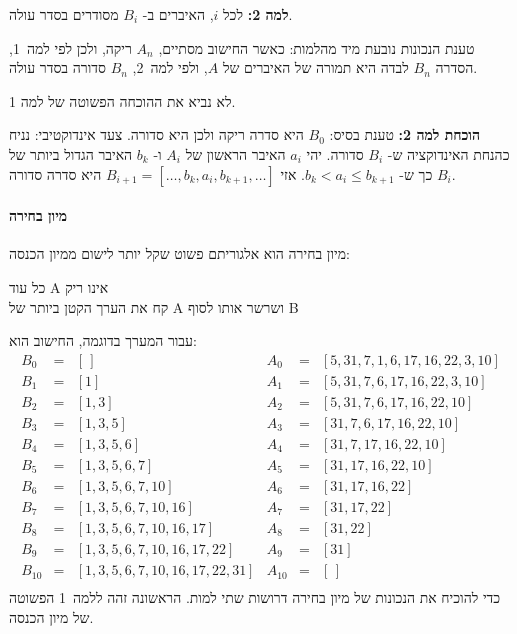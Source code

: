\textbf{%
למה %
2:}
לכל
$i$,
האיברים ב-%
$B_i$
מסודרים בסדר עולה.

טענת הנכונות נובעת מיד מהלמות: כאשר החישוב מסתיים, 
$A_n$
ריקה, ולכן לפי למה~1, הסדרה
$B_n$
לבדה היא תמורה של האיברים של
$A$,
ולפי למה~2,
$B_n$
סדורה בסדר עולה.

לא נביא את ההוכחה הפשוטה של למה 1.

\textbf{%
הוכחת למה %
2:}
טענת בסיס: 
$B_0$
היא סדרה ריקה ולכן היא סדורה. צעד אינדוקטיבי: נניח כהנחת האינדוקציה ש-%
$B_i$
סדורה. יהי 
$a_i$
האיבר הראשון של
$A_i$
ו-%
$b_k$
האיבר הגדול ביותר של
$B_i$
כך ש-%
$b_k < a_i \leq b_{k+1}$. 
אזי
$B_{i+1} = [\ldots,b_k,a_i,b_{k+1},\ldots]$
היא סדרה סדורה.

\paragraph{%
מיון בחירה%
}

מיון בחירה הוא אלגוריתם פשוט שקל יותר לישום ממיון הכנסה:

\medskip

\hspace*{3em}%
כל עוד A אינו ריק\\
\hspace*{6em}%
קח את הערך הקטן ביותר של A ושרשר אותו לסוף B

\medskip

עבור המערך בדוגמה, החישוב הוא:
\[
\begin{array}{lll}
B_0&=&[\,]\\
B_1&=&[1]\\
B_2&=&[1,3]\\
B_3&=&[1,3,5]\\
B_4&=&[1,3,5,6]\\
B_5&=&[1,3,5,6,7]\\
B_6&=&[1,3,5,6,7,10]\\
B_7&=&[1,3,5,6,7,10,16]\\
B_8&=&[1,3,5,6,7,10,16,17]\\
B_9&=&[1,3,5,6,7,10,16,17,22]\\
B_{10}&=&[1,3,5,6,7,10,16,17,22,31]\\
\end{array}
\begin{array}{lll}
A_0&=&[5,31,7,1,6,17,16,22,3,10]\\
A_1&=&[5,31,7,6,17,16,22,3,10]\\
A_2&=&[5,31,7,6,17,16,22,10]\\
A_3&=&[31,7,6,17,16,22,10]\\
A_4&=&[31,7,17,16,22,10]\\
A_5&=&[31,17,16,22,10]\\
A_6&=&[31,17,16,22]\\
A_7&=&[31,17,22]\\
A_8&=&[31,22]\\
A_9&=&[31]\\
A_{10}&=&[\,]\\
\end{array}
\]
כדי להוכיח את הנכונות של מיון בחירה דרושות שתי למות. הראשונה זהה ללמה~1 הפשוטה של מיון הכנסה.

